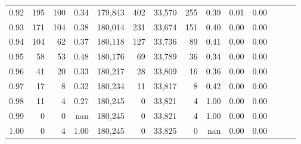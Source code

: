 \begin{tabular}{rrrrrrrrrrrrrr}
0.92 &    195 &  100 &  0.34 &  179,843 &      402 &  33,570 &     255 &  0.39 &  0.01 &      0.00 \\
0.93 &    171 &  104 &  0.38 &  180,014 &      231 &  33,674 &     151 &  0.40 &  0.00 &      0.00 \\
0.94 &    104 &   62 &  0.37 &  180,118 &      127 &  33,736 &      89 &  0.41 &  0.00 &      0.00 \\
0.95 &     58 &   53 &  0.48 &  180,176 &       69 &  33,789 &      36 &  0.34 &  0.00 &      0.00 \\
0.96 &     41 &   20 &  0.33 &  180,217 &       28 &  33,809 &      16 &  0.36 &  0.00 &      0.00 \\
0.97 &     17 &    8 &  0.32 &  180,234 &       11 &  33,817 &       8 &  0.42 &  0.00 &      0.00 \\
0.98 &     11 &    4 &  0.27 &  180,245 &        0 &  33,821 &       4 &  1.00 &  0.00 &      0.00 \\
0.99 &      0 &    0 &   nan &  180,245 &        0 &  33,821 &       4 &  1.00 &  0.00 &      0.00 \\
1.00 &      0 &    4 &  1.00 &  180,245 &        0 &  33,825 &       0 &   nan &  0.00 &      0.00 \\
\bottomrule
\end{tabular}
